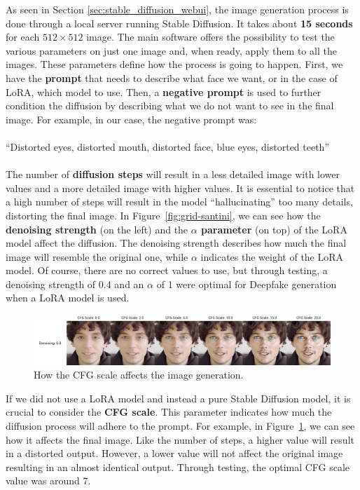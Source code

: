 \documentclass[preprint]{elsarticle}
\begin{document}
As seen in Section \ref{sec:stable_diffusion_webui}, the image generation process is done through 
a local server running Stable Diffusion. 
It takes about \textbf{15 seconds} for each $512 \times 512$ image. 
The main software offers the possibility to test the various parameters 
on just one image and, when ready, apply them to all the images. 
These parameters define how the process is going to happen.
First, we have the \textbf{prompt} that needs to describe what face we want, or in the case of LoRA, 
which model to use.
Then, a \textbf{negative prompt} is used to further condition the diffusion by 
describing what we do not want to see in the final image. 
For example, in our case, the negative prompt was:\\\\
``Distorted eyes, distorted mouth, distorted face, blue eyes, distorted teeth''\\\\
The number of \textbf{diffusion steps} will result in a less detailed image with lower values and 
a more detailed image with higher values. 
It is essential to notice that a high number of steps will result in the model 
``hallucinating'' too many details, distorting the final image.
In Figure~\ref{fig:grid-santini}, we can see how the \textbf{denoising strength} (on the left) 
and the \textbf{$\alpha$ parameter} (on top) of the LoRA model affect the diffusion. 
The denoising strength describes how much the final image will resemble the original one, 
while $\alpha$ indicates the weight of the LoRA model. 
Of course, there are no correct values to use, but through testing, 
a denoising strength of 0.4 and an $\alpha$ of 1 were optimal for
Deepfake generation when a LoRA model is used. 
\begin{figure}[H]
	\centering
	\includegraphics[width=\textwidth, keepaspectratio]{img/project_img/cfg-examples.png}
	\caption{How the CFG scale affects the image generation.}
	\label{fig:cfg-examples}
\end{figure}
If we did not use a LoRA model and instead a pure Stable Diffusion model, 
it is crucial to consider the \textbf{CFG scale}. 
This parameter indicates how much the diffusion process will adhere to the prompt. 
For example, in Figure~\ref{fig:cfg-examples}, we can see how it affects the final image. 
Like the number of steps, a higher value will result in a distorted output. 
However, a lower value will not affect the original image resulting in an almost identical output. 
Through testing, the optimal CFG scale value was around 7.
\end{document}
